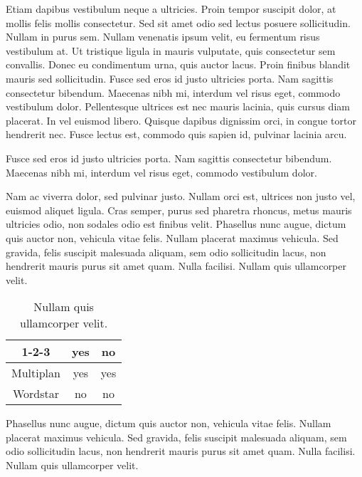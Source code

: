 Etiam dapibus vestibulum neque a ultricies. Proin tempor suscipit dolor, at mollis felis mollis consectetur. Sed sit amet odio sed lectus posuere sollicitudin. Nullam in purus sem. Nullam venenatis ipsum velit, eu fermentum risus vestibulum at. Ut tristique ligula in mauris vulputate, quis consectetur sem convallis. Donec eu condimentum urna, quis auctor lacus. Proin finibus blandit mauris sed sollicitudin. Fusce sed eros id justo ultricies porta. Nam sagittis consectetur bibendum. Maecenas nibh mi, interdum vel risus eget, commodo vestibulum dolor. Pellentesque ultrices est nec mauris lacinia, quis cursus diam placerat. In vel euismod libero. Quisque dapibus dignissim orci, in congue tortor hendrerit nec. Fusce lectus est, commodo quis sapien id, pulvinar lacinia arcu.

\begin{theorem}
Fusce sed eros id justo ultricies porta. Nam sagittis consectetur bibendum. Maecenas nibh mi, interdum vel risus eget, commodo vestibulum dolor.
\end{theorem}

Nam ac viverra dolor, sed pulvinar justo. Nullam orci est, ultrices non justo vel, euismod aliquet ligula. Cras semper, purus sed pharetra rhoncus, metus mauris ultricies odio, non sodales odio est finibus velit. Phasellus nunc augue, dictum quis auctor non, vehicula vitae felis. Nullam placerat maximus vehicula. Sed gravida, felis suscipit malesuada aliquam, sem odio sollicitudin lacus, non hendrerit mauris purus sit amet quam. Nulla facilisi. Nullam quis ullamcorper velit.

\begin{table}
\centering
\begin{tabular}{|c|c|c|}
\hline
1-2-3 & yes & no \\
\hline
Multiplan & yes & yes \\
\hline
Wordstar & no & no \\
\hline
\end{tabular}
\caption{Nullam quis ullamcorper velit.}
\end{table}
Phasellus nunc augue, dictum quis auctor non, vehicula vitae felis. Nullam placerat maximus vehicula. Sed gravida, felis suscipit malesuada aliquam, sem odio sollicitudin lacus, non hendrerit mauris purus sit amet quam. Nulla facilisi. Nullam quis ullamcorper velit.

